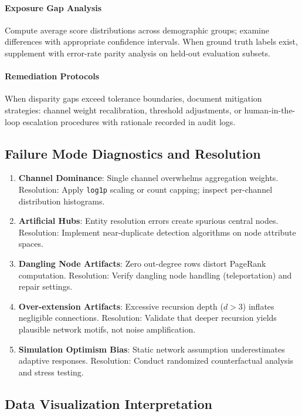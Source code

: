 \documentclass[12pt]{article}
\theoremstyle{plain}
\begin{document}
\paragraph{Exposure Gap Analysis}
Compute average score distributions across demographic groups; examine differences with appropriate confidence intervals. When ground truth labels exist, supplement with error-rate parity analysis on held-out evaluation subsets.

\paragraph{Remediation Protocols}
When disparity gaps exceed tolerance boundaries, document mitigation strategies: channel weight recalibration, threshold adjustments, or human-in-the-loop escalation procedures with rationale recorded in audit logs.

\subsection{Failure Mode Diagnostics and Resolution}
\begin{enumerate}\itemsep0.2em
\item \textbf{Channel Dominance}: Single channel overwhelms aggregation weights. Resolution: Apply \texttt{log1p} scaling or count capping; inspect per-channel distribution histograms.
\item \textbf{Artificial Hubs}: Entity resolution errors create spurious central nodes. Resolution: Implement near-duplicate detection algorithms on node attribute spaces.
\item \textbf{Dangling Node Artifacts}: Zero out-degree rows distort PageRank computation. Resolution: Verify dangling node handling (teleportation) and repair settings.
\item \textbf{Over-extension Artifacts}: Excessive recursion depth ($d>3$) inflates negligible connections. Resolution: Validate that deeper recursion yields plausible network motifs, not noise amplification.
\item \textbf{Simulation Optimism Bias}: Static network assumption underestimates adaptive responses. Resolution: Conduct randomized counterfactual analysis and stress testing.
\end{enumerate}

\subsection{Data Visualization Interpretation}
\end{document}
